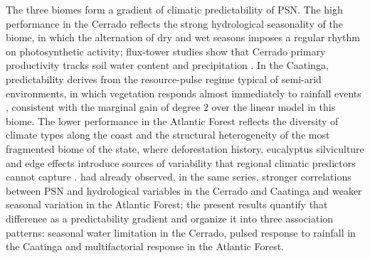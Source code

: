 \documentclass[a4paper,fleqn]{cas-dc}
\begin{document}
The three biomes form a gradient of climatic predictability of PSN. The high performance in the Cerrado reflects the strong hydrological seasonality of the biome, in which the alternation of dry and wet seasons imposes a regular rhythm on photosynthetic activity; flux-tower studies show that Cerrado primary productivity tracks soil water content and precipitation \citep{arruda2016,biudes2021,vourlitis2022}. In the Caatinga, predictability derives from the resource-pulse regime typical of semi-arid environments, in which vegetation responds almost immediately to rainfall events \citep{schwinning2004,mendes2025,silva2026}, consistent with the marginal gain of degree 2 over the linear model in this biome. The lower performance in the Atlantic Forest reflects the diversity of climate types along the coast \citep{alvares2013} and the structural heterogeneity of the most fragmented biome of the state, where deforestation history, eucalyptus silviculture and edge effects introduce sources of variability that regional climatic predictors cannot capture \citep{lima2020,broggio2024}. \citet{benfica2023} had already observed, in the same series, stronger correlations between PSN and hydrological variables in the Cerrado and Caatinga and weaker seasonal variation in the Atlantic Forest; the present results quantify that difference as a predictability gradient and organize it into three association patterns: seasonal water limitation in the Cerrado, pulsed response to rainfall in the Caatinga and multifactorial response in the Atlantic Forest.
\end{document}
